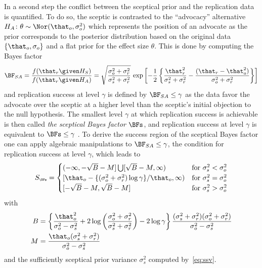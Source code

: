 \begin{subappendices}
In a second step the conflict between the sceptical prior and the replication
data is quantified. To do so, the sceptic is contrasted to the ``advocacy''
alternative $H_{A} \colon \theta \sim \Nor(\that_{o}, \sigma^{2}_{o})$ which
represents the position of an advocate as the prior corresponds to the posterior
distribution based on the original data $\{\that_{o}, \sigma_{o}\}$ and a flat
prior for the effect size $\theta$. This is done by computing the Bayes factor
\begin{align*}
  \BF_{SA}
  = \frac{f(\that_{r} \given H_{S})}{f(\that_{r} \given H_{A})}
  = \sqrt{\frac{\sigma^{2}_{o} + \sigma^{2}_{r}}{\sigma^{2}_{s} + \sigma^{2}_{r}}}
  \, \exp\left[-\frac{1}{2}\left\{\frac{\that_{r}^{2}}{\sigma^{2}_{s} +
  \sigma^{2}_{r}} - \frac{(\that_{r} - \that_{o}^{2})}{\sigma^{2}_{o} +
  \sigma^{2}_{r}}\right\}\right]
\end{align*}
and replication success at level $\gamma$ is defined by $\BF_{SA} \leq \gamma$
as the data favor the advocate over the sceptic at a higher level than the
sceptic's initial objection to the null hypothesis. The smallest level $\gamma$
at which replication success is achievable is then called \emph{the sceptical
  Bayes factor} $\BFs$, and replication success at level $\gamma$ is equivalent
to $\BFs \leq \gamma$ \citep[see][for details on how to compute
$\BFs$]{Pawel2022b}. To derive the success region of the sceptical Bayes factor
one can apply algebraic manipulations to $\BF_{SA} \leq \gamma$, the condition
for replication success at level $\gamma$, which leads to
\begin{align}
  \label{eq:BFssuccess}
  S_{\scriptscriptstyle \BFs}
  = \begin{cases}
    (-\infty, -\sqrt{B} - M] \bigcup [\sqrt{B} - M, \infty) & \text{for} ~ \sigma^{2}_{s} < \sigma^{2}_{o} \\
    [\that_{o} -\{(\sigma^{2}_{o} + \sigma^{2}_{r})\log\gamma\}/\that_{o}, \infty)
    & \text{for} ~ \sigma^{2}_{s} = \sigma^{2}_{o}  \\
    [-\sqrt{B} - M, \sqrt{B} - M] & \text{for} ~ \sigma^{2}_{s} > \sigma^{2}_{o}
    \end{cases}
\end{align}
with
\begin{align*}
  B &= \left\{\frac{\that_{o}^{2}}{\sigma^{2}_{o} - \sigma^{2}_{s}} +
      2\log\left(\frac{\sigma^{2}_{o} + \sigma^{2}_{r}}{\sigma^{2}_{s} + \sigma^{2}_{r}}\right)
      - 2\log \gamma \right\}
      \frac{(\sigma^{2}_{s} + \sigma^{2}_{r})(\sigma^{2}_{o} + \sigma^{2}_{r})}{\sigma^{2}_{o}
       - \sigma^{2}_{s}} \\
  M &= \frac{\that_{o} (\sigma^{2}_{s} + \sigma^{2}_{r})}{\sigma^{2}_{o} - \sigma^{2}_{s}}
\end{align*}
and the sufficiently sceptical prior variance $\sigma^{2}_{s}$ computed
by~\eqref{eq:ssv}.


\end{subappendices}
